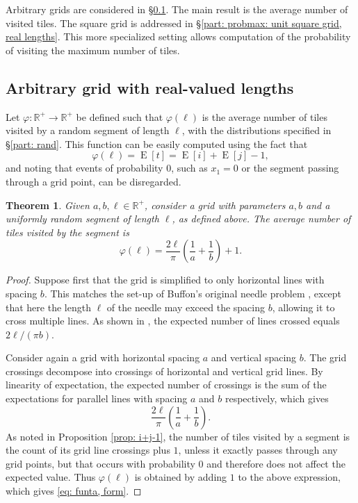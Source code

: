 \documentclass[12pt, a4paper]{article}
\DeclareMathOperator{\E}{E}
\newcommand{\funta}{\varphi} %
\newcommand{\len}{\ell} %
\newcommand{\tiles}{t} %
\newtheorem{theorem}{Theorem}%
\begin{document}
Arbitrary grids are considered in \S\ref{part: probmax: arbitrary grid, real lengths}. The main result is the average number of visited tiles. The square grid is addressed in \S\ref{part: probmax: unit square grid, real lengths}. This more specialized setting allows computation of the probability of visiting the maximum number of tiles.


\subsection{Arbitrary grid with real-valued lengths}
\label{part: probmax: arbitrary grid, real lengths}

Let $\funta: \mathbb R^+ \to \mathbb R^+$ be defined such that $\funta(\len)$ is the average number of tiles visited by a random segment of length $\len$, with the distributions specified in \S\ref{part: rand}. This function can be easily computed using the fact that
\begin{equation}
\label{eq: funta E[i] E[j]}
\funta(\len) = \E[\tiles] = \E[i]+\E[j]-1,
\end{equation}
and noting that events of probability $0$, such as $x_1=0$ or the segment passing through a grid point, can be disregarded.

\begin{theorem}
\label{theo: funta, form}
Given $a, b, \len \in \mathbb R^+$, consider a grid with parameters $a, b$ and a uniformly random segment of length $\len$, as defined above. The average number of tiles visited by the segment is 
\begin{equation}
\label{eq: funta, form}
\funta(\len) = \frac{2\len}{\pi}\left(\frac 1 a + \frac 1 b\right) + 1.
\end{equation}
\end{theorem}

\begin{proof}
Suppose first that the grid is simplified to only horizontal lines with spacing $b$. This matches the set-up of Buffon's original needle problem \cite[section 1.1]{Mathai99}, except that here the length $\len$ of the needle may exceed the spacing $b$, allowing it to cross multiple lines. As shown in \cite{Ramaley69}, the expected number of lines crossed equals $2\len/(\pi b)$.

Consider again a grid with horizontal spacing $a$ and vertical spacing $b$. The grid crossings decompose into crossings of horizontal and vertical grid lines. By linearity of expectation, the expected number of crossings is the sum of the expectations for parallel lines with spacing $a$ and $b$ respectively, which gives
\[
\frac{2\len}{\pi}\left(\frac 1 a + \frac 1 b\right).
\]
As noted in Proposition \ref{prop: i+j-1}, the number of tiles visited by a segment is the count of its grid line crossings plus $1$, unless it exactly passes through any grid points, but that occurs with probability $0$ and therefore does not affect the expected value. Thus $\funta(\len)$ is obtained by adding $1$ to the above expression, which gives \eqref{eq: funta, form}.
\end{proof}
\end{document}
